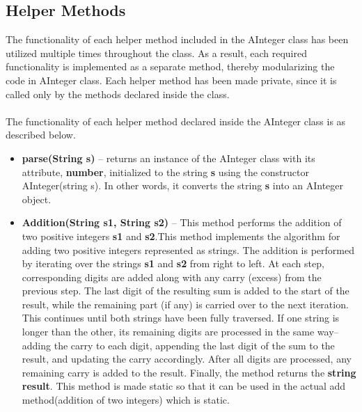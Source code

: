 \documentclass[a4paper,12pt]{article}
\begin{document}
\subsection{Helper Methods}
The functionality of each helper method included in the AInteger class has been utilized multiple times throughout the class. As a result, each required functionality is implemented as a separate method, thereby modularizing the code in AInteger class. Each helper method has been made private, since it is called only by the methods declared inside the class.\\\\
The functionality of each helper method declared inside the AInteger class is as described below.
\begin{itemize}
    \item \textbf{parse(String s)} -- returns an instance of the AInteger class with its attribute, \textbf{number}, initialized to the string \textbf{s} using the constructor AInteger(string s). In other words, it converts the string \textbf{s} into an AInteger object.\\

    \item \textbf{Addition(String s1, String s2)} -- This method performs the addition of two positive integers \textbf{s1} and \textbf{s2}.This method implements the algorithm for adding two positive integers represented as strings. The addition is performed by iterating over the strings \textbf{s1} and \textbf{s2} from right to left. At each step, corresponding digits are added along with any carry (excess) from the previous step. The last digit of the resulting sum is added to the start of the result, while the remaining part (if any) is carried over to the next iteration. This continues until both strings have been fully traversed. If one string is longer than the other, its remaining digits are processed in the same way--adding the carry to each digit, appending the last digit of the sum to the result, and updating the carry accordingly. After all digits are processed, any remaining carry is added to the result. Finally, the method returns the \textbf{string result}. This method is made static so that it can be used in the actual add method(addition of two integers) which is static.\\


\end{itemize}
\end{document}
